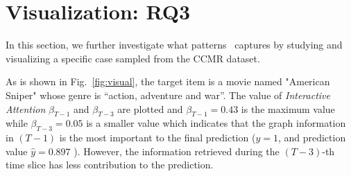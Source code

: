 \section{Visualization: RQ3}
In this section, we further investigate what patterns \score~captures by studying and visualizing a specific case sampled from the CCMR dataset. 

As is shown in Fig.~\ref{fig:visual}, the target item is a movie named "American Sniper" whose genre is ``action, adventure and war''. The value of \textit{Interactive Attention} $\beta_{T-1}$ and $\beta_{T-3}$ are plotted and $\beta_{T-1} = 0.43$ is the maximum value while $\beta_{T-3} = 0.05$ is a smaller value which indicates that the graph information in $(T-1)$ is the most important to the final prediction ($y=1$, and prediction value $\hat{y}=0.897$ ). However, the information retrieved during the $(T-3)$-th time slice has less contribution to the prediction.

